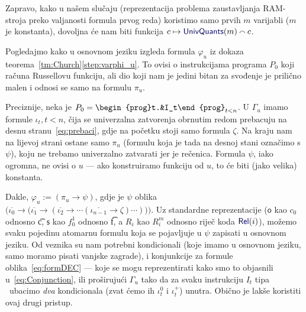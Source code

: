 Zapravo, kako u našem slučaju (reprezentacija problema zaustavljanja RAM-stroja preko valjanosti formula prvog reda) koristimo samo prvih $m$ varijabli ($m$ je konstanta), dovoljna će nam biti funkcija $c\mapsto\f{UnivQuants}(m)\conc{}c$.

Pogledajmo kako u osnovnom jeziku izgleda formula $\varphi_u$ iz dokaza teorema~\ref{tm:Church}\eqref{step:varphi_u}. To ovisi o instrukcijama programa $P_0$ koji računa Russellovu funkciju, ali dio koji nam je jedini bitan za svođenje je prilično malen i odnosi se samo na formulu $\pi_u$.

Preciznije, neka je $P_0=\begin{prog}t.&I_t\end{prog}_{t<n}$. U $\Gamma_u$ imamo formule $\iota_t,t<n$, čija se univerzalna zatvorenja obrnutim redom prebacuju na desnu stranu~\eqref{eq:prebaci}, gdje na početku stoji samo formula $\zeta$. Na kraju nam na lijevoj strani ostane samo $\pi_u$ (formulu koja je tada na desnoj stani označimo s $\psi$), koju ne trebamo univerzalno zatvarati jer je rečenica. Formula $\psi$, iako ogromna, ne ovisi o $u$ --- ako konstruiramo funkciju od $u$, to će biti (jako velika) konstanta.

    Dakle, $\varphi_u:=(\pi_u\to\psi)$, gdje je $\psi$ oblika $\bigl(\overline{\iota_0}\to\bigl(\overline{\iota_1}\to(\overline{\iota_2}\to\dotsb(\overline{\iota_{n-1}}\to\zeta)\dotsm)\bigr)\bigr)$\text.
Uz standardne reprezentacije ($\mathsf o$ kao $c_0$ odnosno \t c, $\mathsf s$ kao $f_0^1$ odnosno \t f, a $R_i$ kao $R_i^m$ odnosno riječ koda $\f{Rel}(i)$), možemo svaku pojedinu atomarnu formulu koja se pojavljuje u $\psi$ zapisati u osnovnom jeziku. Od veznika su nam potrebni kondicionali (koje imamo u osnovnom jeziku, samo moramo pisati vanjske zagrade), i konjunkcije za formule oblika~\eqref{eq:formDEC} --- koje se mogu reprezentirati kako smo to objasnili u~\eqref{eq:Conjunction}, ili proširujući $\Gamma_u$ tako da za svaku instrukciju $I_t$ tipa \dec\ ubacimo \emph{dva} kondicionala (zvat ćemo ih $\iota_t^0$ i $\iota_t^+$) unutra. Obično je lakše koristiti ovaj drugi pristup.

